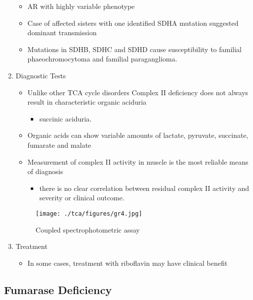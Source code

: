 \documentclass{scrartcl}
\begin{document}
\begin{enumerate}
\begin{itemize}
\item AR with highly variable phenotype
\item Case of affected sisters with one identified SDHA mutation suggested
dominant transmission
\item Mutations in SDHB, SDHC and SDHD cause susceptibility to familial
phaeochromocytoma and familial paraganglioma.
\end{itemize}

\item Diagnostic Tests
\label{sec:orgf43a5dc}
\begin{itemize}
\item Unlike other TCA cycle disorders Complex II deficiency does not always
result in characteristic organic aciduria
\begin{itemize}
\item succinic aciduria.
\end{itemize}
\item Organic acids can show variable amounts of lactate, pyruvate, succinate, fumarate and malate
\item Measurement of complex II activity in muscle is the most reliable
means of diagnosis
\begin{itemize}
\item there is no clear correlation between residual complex II activity
and severity or clinical outcome.
\end{itemize}
\end{itemize}

\begin{figure}[htbp]
\centering
\texttt{[image: ./tca/figures/gr4.jpg]}
\caption{\label{fig:org8f4696b}
Coupled spectrophotometric assay}
\end{figure}

\item Treatment
\label{sec:orgac4bcce}
\begin{itemize}
\item In some cases, treatment with riboflavin may have clinical benefit
\end{itemize}
\end{enumerate}

\subsection{Fumarase Deficiency}
\label{sec:org4e8fcfa}
\end{document}
